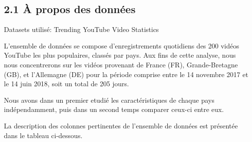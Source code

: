 \documentclass[11pt]{article}
\begin{document}
\hypertarget{uxe0-propos-des-donnuxe9es}{%
\subsection{2.1 À propos des données}\label{uxe0-propos-des-donnuxe9es}}

Datasets utilisé: Trending YouTube Video Statistics

L'ensemble de données se compose d'enregistrements quotidiens des 200
vidéos YouTube les plus populaires, classés par pays. Aux fins de cette
analyse, nous nous concentrerons sur les vidéos provenant de France
(FR), Grande-Bretagne (GB), et l'Allemagne (DE) pour la période comprise
entre le 14 novembre 2017 et le 14 juin 2018, soit un total de 205
jours.

Nous avons dans un premier etudié les caractéristiques de chaque pays
indépendamment, puis dans un second temps comparer ceux-ci entre eux.

La description des colonnes pertinentes de l'ensemble de données est
présentée dans le tableau ci-dessous.
\end{document}
